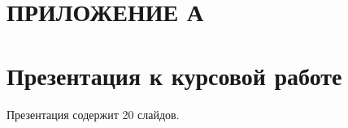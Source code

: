 \section*{\centering ПРИЛОЖЕНИЕ А}

\section*{Презентация к курсовой работе}
Презентация содержит 20 слайдов.
